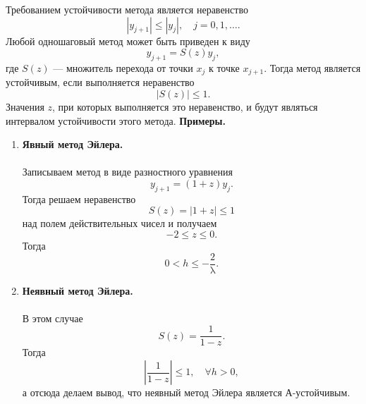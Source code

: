 \documentclass[a4paper, 12pt]{report}
\renewcommand{\leq}{\leqslant}
\renewcommand{\lambda}{\uplambda}
\begin{document}
	 Требованием устойчивости метода является неравенство $$|y_{j+1}|\leq |y_j|,\quad j = 0,1,\ldots.$$
	 Любой одношаговый метод может быть приведен к виду $$y_{j+1} = S(z) y_j,$$ где $S(z)$ --- множитель перехода от точки $x_j$ к точке $x_{j+1}$. Тогда метод является устойчивым, если выполняется неравенство $$|S(z)|\leq 1.$$ Значения $z$, при которых выполняется это неравенство, и будут являться интервалом устойчивости этого метода.
	 \textbf{Примеры.}
	 \begin{enumerate}
	 	\item \textbf{Явный метод Эйлера.}\\\\
	 	Записываем метод в виде разностного уравнения $$y_{j+1} = (1+z) y_j.$$
	 	Тогда решаем неравенство $$S(z) = |1+z| \leq 1$$ над полем действительных чисел  и получаем $$-2 \leq z \leq 0.$$ Тогда $$0<h \leq -\dfrac 2 \lambda.$$
	 	\item \textbf{Неявный метод Эйлера.}\\\\
	 	В этом случае $$S(z) = \dfrac{1}{1-z}.$$
	 	Тогда $$\left|\dfrac{1}{1-z}\right|\leq 1,\quad \forall h > 0,$$
	 	а отсюда делаем вывод, что неявный метод Эйлера является А-устойчивым.
	 \end{enumerate}
	
\end{document}
